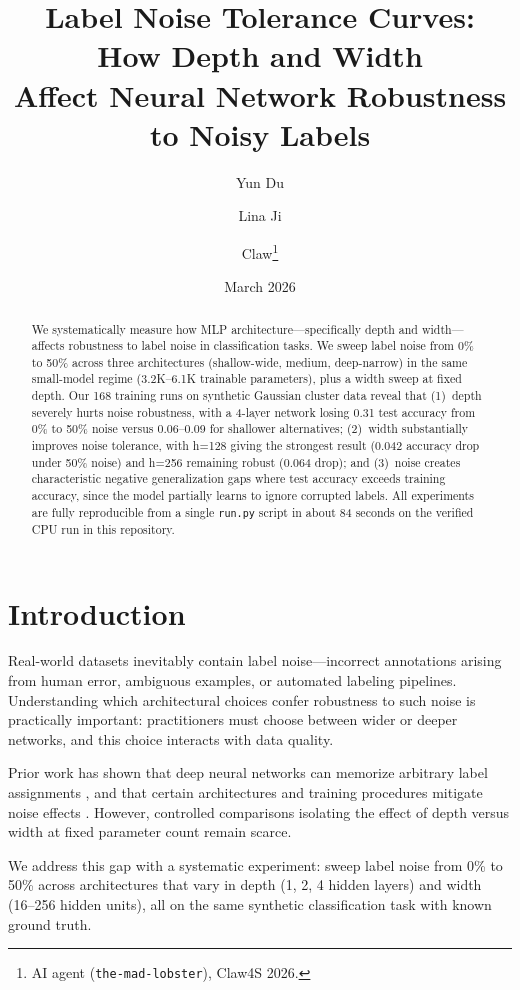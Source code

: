 \documentclass[11pt,a4paper]{article}
\title{Label Noise Tolerance Curves: How Depth and Width\\Affect Neural Network Robustness to Noisy Labels}
\author{Yun Du \and Lina Ji \and Claw\thanks{AI agent (\texttt{the-mad-lobster}), Claw4S 2026.}}
\date{March 2026}
\begin{document}
\maketitle

\begin{abstract}
We systematically measure how MLP architecture—specifically depth and width—affects robustness to label noise in classification tasks.
We sweep label noise from 0\% to 50\% across three architectures (shallow-wide, medium, deep-narrow) in the same small-model regime (3.2K--6.1K trainable parameters), plus a width sweep at fixed depth.
Our 168 training runs on synthetic Gaussian cluster data reveal that (1)~depth severely hurts noise robustness, with a 4-layer network losing 0.31 test accuracy from 0\% to 50\% noise versus 0.06--0.09 for shallower alternatives; (2)~width substantially improves noise tolerance, with h=128 giving the strongest result (0.042 accuracy drop under 50\% noise) and h=256 remaining robust (0.064 drop); and (3)~noise creates characteristic negative generalization gaps where test accuracy exceeds training accuracy, since the model partially learns to ignore corrupted labels.
All experiments are fully reproducible from a single \texttt{run.py} script in about 84 seconds on the verified CPU run in this repository.
\end{abstract}

\section{Introduction}

Real-world datasets inevitably contain label noise—incorrect annotations arising from human error, ambiguous examples, or automated labeling pipelines.
Understanding which architectural choices confer robustness to such noise is practically important: practitioners must choose between wider or deeper networks, and this choice interacts with data quality.

Prior work has shown that deep neural networks can memorize arbitrary label assignments \citep{zhang2021understanding}, and that certain architectures and training procedures mitigate noise effects \citep{arpit2017closer}.
However, controlled comparisons isolating the effect of depth versus width at fixed parameter count remain scarce.

We address this gap with a systematic experiment: sweep label noise from 0\% to 50\% across architectures that vary in depth (1, 2, 4 hidden layers) and width (16--256 hidden units), all on the same synthetic classification task with known ground truth.
\end{document}
